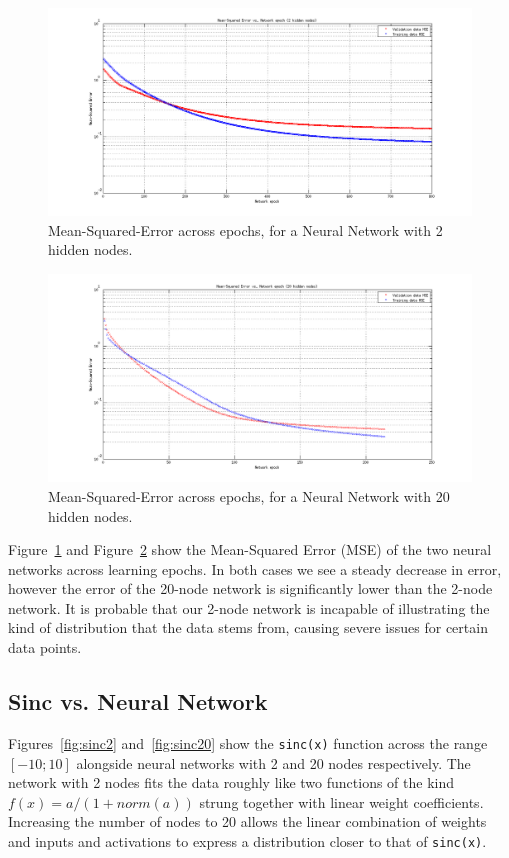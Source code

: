 \begin{figure}[h!]
  \includegraphics[width=\linewidth]{images/mse2.png}
  \caption{Mean-Squared-Error across epochs, for a Neural Network with 2 hidden nodes.
  \label{fig:mse2}}
\end{figure}

\begin{figure}[h!]
  \includegraphics[width=\linewidth]{images/mse20.png}
  \caption{Mean-Squared-Error across epochs, for a Neural Network with 20 hidden nodes.
  \label{fig:mse20}}
\end{figure}

Figure~\ref{fig:mse2} and Figure~\ref{fig:mse20} show the Mean-Squared Error (MSE) of the two
neural networks across learning epochs. In both cases we see a steady decrease in error, however
the error of the 20-node network is significantly lower than the 2-node network. It is probable that
our 2-node network is incapable of illustrating the kind of distribution that the data stems from,
causing severe issues for certain data points.

\subsection*{Sinc vs. Neural Network}
Figures~\ref{fig:sinc2} and~\ref{fig:sinc20} show the \texttt{sinc(x)} function across the range
$[-10; 10]$ alongside neural networks with 2 and 20 nodes respectively. The network with 2 nodes
fits the data roughly like two functions of the kind $f(x)=a/(1+norm(a))$ strung together with linear
weight coefficients. Increasing the number of nodes to 20 allows the linear combination of weights
and inputs and activations to express a distribution closer to that of \texttt{sinc(x)}.

